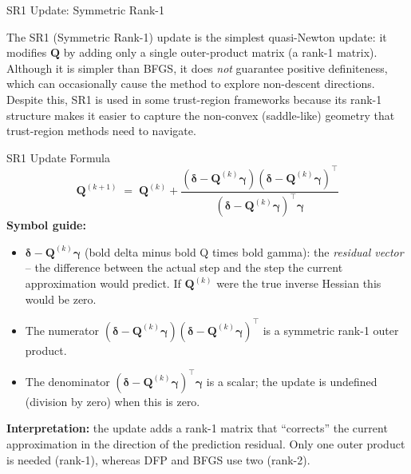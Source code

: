 \documentclass[aspectratio=169,10pt]{beamer}
\newcommand{\deltabf}{\boldsymbol{\delta}}
\newcommand{\gammabf}{\boldsymbol{\gamma}}
\begin{document}
\begin{frame}[allowframebreaks]{SR1 Update: Symmetric Rank-1}

  The SR1 (Symmetric Rank-1) update is the simplest quasi-Newton update: it
  modifies $\mathbf{Q}$ by adding only a single outer-product matrix (a rank-1
  matrix).  Although it is simpler than BFGS, it does \emph{not} guarantee
  positive definiteness, which can occasionally cause the method to explore
  non-descent directions.  Despite this, SR1 is used in some trust-region
  frameworks because its rank-1 structure makes it easier to capture the
  non-convex (saddle-like) geometry that trust-region methods need to navigate.

  \begin{block}{SR1 Update Formula}
    \[
      \mathbf{Q}^{(k+1)} \;=\; \mathbf{Q}^{(k)}
        + \frac{\left(\deltabf - \mathbf{Q}^{(k)}\gammabf\right)
                \left(\deltabf - \mathbf{Q}^{(k)}\gammabf\right)^\top}
               {\left(\deltabf - \mathbf{Q}^{(k)}\gammabf\right)^\top\gammabf}
    \]
    \textbf{Symbol guide:}
    \begin{itemize}
      \item $\deltabf - \mathbf{Q}^{(k)}\gammabf$ (bold delta minus bold Q times
        bold gamma): the \emph{residual vector} -- the difference between the
        actual step and the step the current approximation would predict.  If
        $\mathbf{Q}^{(k)}$ were the true inverse Hessian this would be zero.
      \item The numerator $(\deltabf - \mathbf{Q}^{(k)}\gammabf)(\deltabf -
        \mathbf{Q}^{(k)}\gammabf)^\top$ is a symmetric rank-1 outer product.
      \item The denominator $(\deltabf - \mathbf{Q}^{(k)}\gammabf)^\top\gammabf$
        is a scalar; the update is undefined (division by zero) when this is zero.
    \end{itemize}
    \textbf{Interpretation:} the update adds a rank-1 matrix that ``corrects'' the
    current approximation in the direction of the prediction residual.  Only one
    outer product is needed (rank-1), whereas DFP and BFGS use two (rank-2).
  \end{block}


\end{frame}
\end{document}
